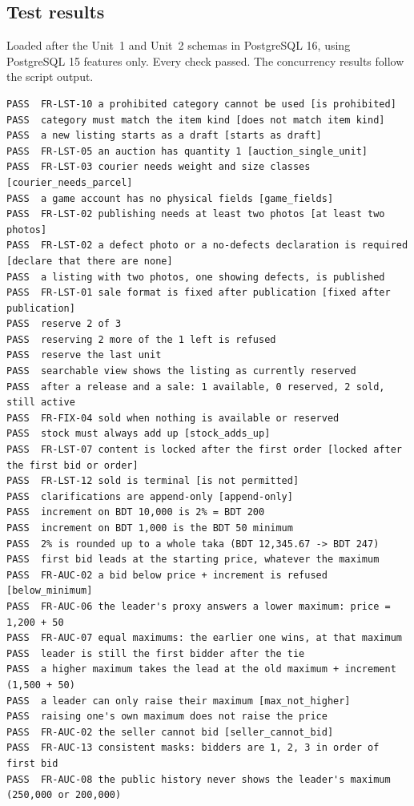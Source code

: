 \documentclass[11pt,a4paper]{article}
\begin{document}
\subsection{Test results}
\label{app:tests}
Loaded after the Unit~1 and Unit~2 schemas in PostgreSQL 16, using PostgreSQL 15 features only. Every check passed. The concurrency results follow the script output.
{\scriptsize
\begin{verbatim}
PASS  FR-LST-10 a prohibited category cannot be used [is prohibited]
PASS  category must match the item kind [does not match item kind]
PASS  a new listing starts as a draft [starts as draft]
PASS  FR-LST-05 an auction has quantity 1 [auction_single_unit]
PASS  FR-LST-03 courier needs weight and size classes [courier_needs_parcel]
PASS  a game account has no physical fields [game_fields]
PASS  FR-LST-02 publishing needs at least two photos [at least two photos]
PASS  FR-LST-02 a defect photo or a no-defects declaration is required [declare that there are none]
PASS  a listing with two photos, one showing defects, is published
PASS  FR-LST-01 sale format is fixed after publication [fixed after publication]
PASS  reserve 2 of 3
PASS  reserving 2 more of the 1 left is refused
PASS  reserve the last unit
PASS  searchable view shows the listing as currently reserved
PASS  after a release and a sale: 1 available, 0 reserved, 2 sold, still active
PASS  FR-FIX-04 sold when nothing is available or reserved
PASS  stock must always add up [stock_adds_up]
PASS  FR-LST-07 content is locked after the first order [locked after the first bid or order]
PASS  FR-LST-12 sold is terminal [is not permitted]
PASS  clarifications are append-only [append-only]
PASS  increment on BDT 10,000 is 2% = BDT 200
PASS  increment on BDT 1,000 is the BDT 50 minimum
PASS  2% is rounded up to a whole taka (BDT 12,345.67 -> BDT 247)
PASS  first bid leads at the starting price, whatever the maximum
PASS  FR-AUC-02 a bid below price + increment is refused [below_minimum]
PASS  FR-AUC-06 the leader's proxy answers a lower maximum: price = 1,200 + 50
PASS  FR-AUC-07 equal maximums: the earlier one wins, at that maximum
PASS  leader is still the first bidder after the tie
PASS  a higher maximum takes the lead at the old maximum + increment (1,500 + 50)
PASS  a leader can only raise their maximum [max_not_higher]
PASS  raising one's own maximum does not raise the price
PASS  FR-AUC-02 the seller cannot bid [seller_cannot_bid]
PASS  FR-AUC-13 consistent masks: bidders are 1, 2, 3 in order of first bid
PASS  FR-AUC-08 the public history never shows the leader's maximum (250,000 or 200,000)

\end{verbatim}}
\end{document}

